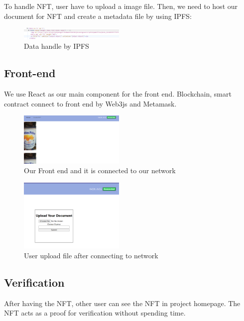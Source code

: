 \documentclass[conference]{IEEEtran}
\begin{document}
To handle NFT, user have to upload a image file. Then, we need to host our document for NFT and create a metadata file by using IPFS:
\begin{figure}[ht]
\centerline{\includegraphics[width=0.45\textwidth]{Ipfs.png}}
\caption{Data handle by IPFS}
\label{fig3}
\end{figure}

\subsection{Front-end}
We use React as our main component for the front end. Blockchain, smart contract connect to front end by Web3js and Metamask.
\begin{figure}[ht]
\centerline{\includegraphics[width=0.45\textwidth]{Front-end.png}}
\caption{Our Front end and it is connected to our network}
\label{fig4}
\end{figure}

\begin{figure}[ht]
\centerline{\includegraphics[width=0.45\textwidth]{Upload.png}}
\caption{User upload file after connecting to network}
\label{fig5}
\end{figure}


\subsection{Verification}
After having the NFT, other user can see the NFT in project homepage. The NFT acts as a proof for verification without spending time.  
\end{document}
